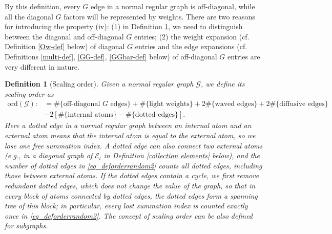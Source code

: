 \documentclass{article}
\newcommand{\1}{\mathds{1}}
\numberwithin{equation}{section}
\renewcommand{\cal}{\mathcal}
\newcommand{\dashed}{\text{diffusive}}
\theoremstyle{plain} %
\newtheorem{definition}[theorem]{Definition}
\theoremstyle{remark}
\newcommand{\Sele}{{\mathcal E}}
\begin{document}
By this definition,  every $G$ edge in a normal regular graph is off-diagonal, while all the diagonal $G$ factors will be represented by weights. There are two reasons for introducing the property (iv): {(1)} in Definition \ref{def scaling}, we need to distinguish between the diagonal and off-diagonal $G$ entries; {(2)} the weight expansion (cf. Definition \ref{Ow-def} below) of diagonal $G$ entries and the edge expansions (cf. Definitions \ref{multi-def}, \ref{GG-def}, \ref{GGbar-def} below) of off-diagonal $G$ entries are very different in nature. 

      
   \begin{definition} [Scaling order] \label{def scaling}
   Given a normal regular  graph $\cal G$, we define its scaling order as 
\begin{align}
\text{ord}(\cal G):&= \#\{\text{off-diagonal }  G  \text{ edges}\} + \#\{\text{light weights}\} + 2\#\{ \text{waved edges}\}  + 2 \#\{\text{$\dashed$ edges}\} \nonumber\\
&  - 2\left[ \#\{\text{internal atoms}\}- \#\{\text{dotted edges}\} \right]. \label{eq_deforderrandom2}
\end{align}
Here a dotted edge in a normal regular graph between an internal atom and an external atom means that the internal atom is equal to the external atom, so we lose one free summation index. A dotted edge can also connect two external atoms (e.g., in a diagonal graph of $\Sele_l$ in Definition \ref{collection elements} below), and the number of dotted edges in \eqref{eq_deforderrandom2} counts all dotted edges, including those between external atoms. If the dotted edges contain a cycle, we first remove redundant dotted edges, which does not change the value of the graph, so that in every block of atoms connected by dotted edges, the dotted edges form a spanning tree of this block; in particular, every lost summation index is counted exactly once in \eqref{eq_deforderrandom2}.
The concept of scaling order can  be also defined for subgraphs. 
  \end{definition} 
  
\end{document}
